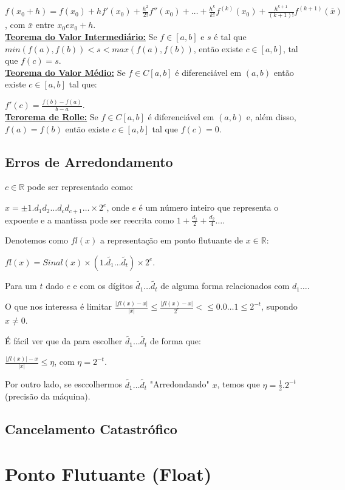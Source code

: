 \documentclass[12pt]{book}
\newcommand{\real}{\mathbb{R}}
\newcommand{\mytitle}[1]{\textbf{\underline{#1}}}
\begin{document}
$f(x_0+h)=f(x_0)+hf'(x_0)+\frac{h^2}{2!}f''(x_0)+\dots +\frac{h^k}{k!}f^{(k)}(x_0)+\frac{h^{k+1}}{(k+1)!}f^{(k+1)}(\bar{x})$, com $\bar{x}$ entre $x_0 e x_0+h$.\\
\mytitle{Teorema do Valor Intermediário:} Se $f \in [a,b]$ e $s$ é tal que $min(f(a),f(b))<s<max(f(a),f(b))$, então existe $c \in [a,b]$, tal que $f(c)=s$.\\
\mytitle{Teorema do Valor Médio:} Se $f \in C[a,b]$ é diferenciável em $(a,b)$ então existe $c \in [a,b]$ tal que:

$f'(c)=\frac{f(b)-f(a)}{b-a}$.\\
\mytitle{Terorema de Rolle:} Se $f \in C[a,b]$ é diferenciável em $(a,b)$ e, além disso, $f(a)=f(b)$ então existe $c \in [a,b]$ tal que $f(c)=0$.

\section{Erros de Arredondamento}

$c \in \real$ pode ser representado como:

$x=\pm 1.d_1d_2\dots d_cd_{c+1}\dots \times 2^e$, onde $e$ é um número inteiro que representa o expoente e a mantissa pode ser reecrita como $1+\frac{d_1}{2}+\frac{d_2}{4}\dots$.

Denotemos como $fl(x)$ a representação em ponto flutuante de $x\in \real$:

$fl(x)=Sinal(x)\times (1.\tilde{d_1}\dots \tilde{d_t})\times 2^e$.

Para um $t$ dado $e$ e com os dígitos $\tilde{d_1}\dots \tilde{d_t}$ de alguma forma relacionados com $d_1\dots$.

O que nos interessa é limitar $\frac{|fl(x)-x|}{|x|}\leq \frac{|fl(x)-x|}{2^e}<\leq 0.0\dots 1\leq 2^{-t}$, supondo $x\neq 0$.

É fácil ver que da para escolher $\tilde{d_1}\dots \tilde{d_t}$ de forma que:

$\frac{|fl(x)|-x}{|x|}\leq \eta$, com $\eta = 2^{-t}$.

Por outro lado, se esccolhermos $\tilde{d_1}\dots \tilde{d_t}$ "Arredondando" $x$, temos que $\eta = \frac{1}{2}.2^{-t}$ (precisão da máquina).

\section{Cancelamento Catastrófico}

\chapter{Ponto Flutuante (Float)}
\end{document}
